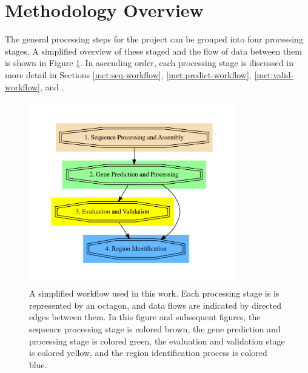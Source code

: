 \section{Methodology Overview}

The general processing steps for the project can be grouped into four
processing stages. A simplified overview of these staged and the flow
of data between them is shown in Figure \ref{fig:simple-work}. In
ascending order, each processing stage is discussed in more detail in
Sections \ref{met:seq-workflow}, \ref{met:predict-workflow},
\ref{met:valid-workflow}, and .

\begin{figure}
  \centering
  \includegraphics[width=0.8\textwidth]{figures/workflow-simple.pdf}
  \caption{A simplified workflow used in this work. Each processing
    stage is is represented by an octagon, and data flows are
    indicated by directed edges between them. In this figure and
    subsequent figures, the sequence processing stage is colored
    brown, the gene prediction and processing stage is colored green,
    the evaluation and validation stage is colored yellow, and the
    region identification process is colored blue.}
  \label{fig:simple-work}
\end{figure}


